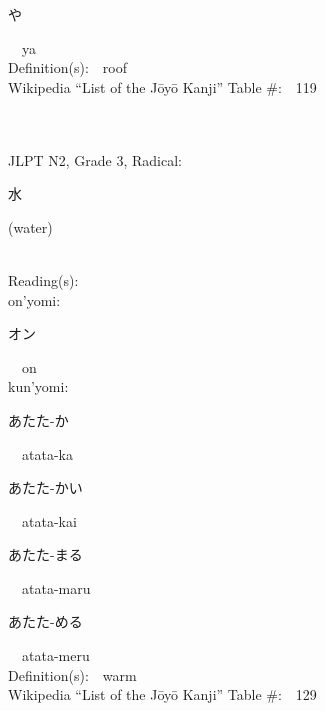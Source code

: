\begin{multicols}{2}
{\hspace*{2em}}{\begin{CJK}{UTF8}{min} や \end{CJK}}\ \ ya\ \ \\
Definition(s):\ \ roof \\
Wikipedia ``List of the J\=oy\=o Kanji'' Table \#:\ \ 119 \\
\ \ \\
{\fontsize{34pt}{40pt}  }\ \ \\  %
{JLPT N2, Grade 3, Radical:\ \ {\begin{CJK}{UTF8}{min} 水 \end{CJK}} (water) } \\
Reading(s):\ \ \\
{\hspace*{1em}}on'yomi:\ \ \\
{\hspace*{2em}}{\begin{CJK}{UTF8}{min} オン \end{CJK}}\ \ on\ \ \\
{\hspace*{1em}}kun'yomi:\ \ \\
{\hspace*{2em}}{\begin{CJK}{UTF8}{min} あたた-か \end{CJK}}\ \ atata-ka\ \ \\
{\hspace*{2em}}{\begin{CJK}{UTF8}{min} あたた-かい \end{CJK}}\ \ atata-kai\ \ \\
{\hspace*{2em}}{\begin{CJK}{UTF8}{min} あたた-まる \end{CJK}}\ \ atata-maru\ \ \\
{\hspace*{2em}}{\begin{CJK}{UTF8}{min} あたた-める \end{CJK}}\ \ atata-meru\ \ \\
Definition(s):\ \ warm \\
Wikipedia ``List of the J\=oy\=o Kanji'' Table \#:\ \ 129 \\
\ \ \\
{\fontsize{34pt}{40pt}  }\ \ \\  %

\end{multicols}
